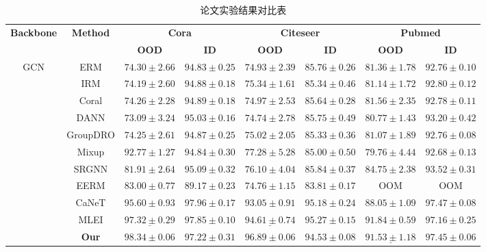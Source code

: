 \documentclass{article}
\begin{document}
\begin{table}[htbp]
\centering
\caption{论文实验结果对比表}
\label{tab:results}
\small %
\setlength{\tabcolsep}{6pt} %
\renewcommand{\arraystretch}{1.2} %

\begin{tabular}{c c | c c | c c | c c}
\toprule
\multirow{2}{*}{\textbf{Backbone}} & \multirow{2}{*}{\textbf{Method}} & \multicolumn{2}{c}{\textbf{Cora}} & \multicolumn{2}{c}{\textbf{Citeseer}} & \multicolumn{2}{c}{\textbf{Pubmed}} \\
\cmidrule(lr){3-4} \cmidrule(lr){5-6} \cmidrule(lr){7-8}
& & \textbf{OOD} & \textbf{ID} & \textbf{OOD} & \textbf{ID} & \textbf{OOD} & \textbf{ID} \\
\midrule

\multirow{11}{*}{GCN} 
& ERM      & $74.30 \pm 2.66$ & $94.83 \pm 0.25$ & $74.93 \pm 2.39$ & $85.76 \pm 0.26$ & $81.36 \pm 1.78$ & $92.76 \pm 0.10$ \\
& IRM      & $74.19 \pm 2.60$ & $94.88 \pm 0.18$ & $75.34 \pm 1.61$ & $85.34 \pm 0.46$ & $81.14 \pm 1.72$ & $92.80 \pm 0.12$ \\
& Coral    & $74.26 \pm 2.28$ & $94.89 \pm 0.18$ & $74.97 \pm 2.53$ & $85.64 \pm 0.28$ & $81.56 \pm 2.35$ & $92.78 \pm 0.11$ \\
& DANN     & $73.09 \pm 3.24$ & $95.03 \pm 0.16$ & $74.74 \pm 2.78$ & $85.75 \pm 0.49$ & $80.77 \pm 1.43$ & $93.20 \pm 0.42$ \\
& GroupDRO & $74.25 \pm 2.61$ & $94.87 \pm 0.25$ & $75.02 \pm 2.05$ & $85.33 \pm 0.36$ & $81.07 \pm 1.89$ & $92.76 \pm 0.08$ \\
& Mixup    & $92.77 \pm 1.27$ & $94.84 \pm 0.30$ & $77.28 \pm 5.28$ & $85.00 \pm 0.50$ & $79.76 \pm 4.44$ & $92.68 \pm 0.13$ \\
& SRGNN    & $81.91 \pm 2.64$ & $95.09 \pm 0.32$ & $76.10 \pm 4.04$ & $85.84 \pm 0.37$ & $84.75 \pm 2.38$ & $93.52 \pm 0.31$ \\
& EERM     & $83.00 \pm 0.77$ & $89.17 \pm 0.23$ & $74.76 \pm 1.15$ & $83.81 \pm 0.17$ & OOM              & OOM              \\
& CaNeT    & $95.60 \pm 0.93$ & $97.96 \pm 0.17$ & $93.05 \pm 0.91$ & $95.18 \pm 0.24$ & $88.05 \pm 1.09$ & $97.47 \pm 0.08$ \\
& MLEI & $\underline{97.32 \pm 0.29}$ & $97.85 \pm 0.10$ & $\underline{94.61 \pm 0.74}$ & $95.27 \pm 0.15$ & $\mathbf{91.84 \pm 0.59}$ & $97.16 \pm 0.25$ \\ %
\cline{2-8}
& \textbf{Our} & $\mathbf{98.34 \pm 0.06}$ & $97.22 \pm 0.31$ & $\mathbf{96.89 \pm 0.06}$ & $94.53 \pm 0.08$ & $\underline{91.53 \pm 1.18}$ & $97.45 \pm 0.06 $ \\ %


\end{tabular}
\end{table}
\end{document}

